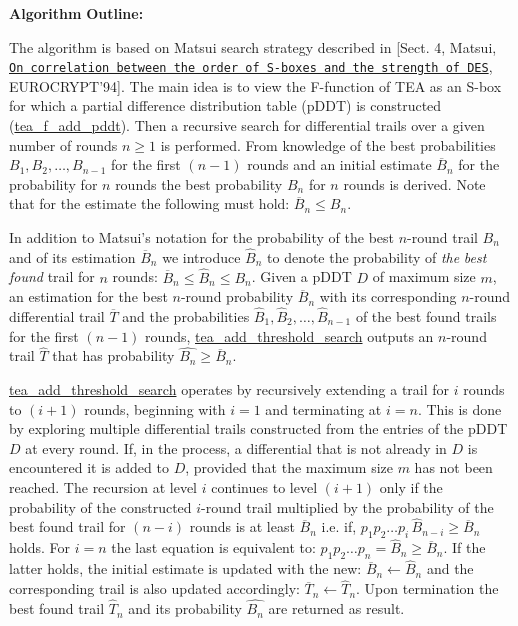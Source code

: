{\bfseries \-Algorithm} {\bfseries \-Outline\-:} 

\-The algorithm is based on \-Matsui search strategy described in \mbox{[}\-Sect. 4, \-Matsui, \href{http://dblp.uni-trier.de/rec/bibtex/conf/eurocrypt/Matsui94}{\tt \-On correlation between the order of \-S-\/boxes and the strength of \-D\-E\-S}, \-E\-U\-R\-O\-C\-R\-Y\-P\-T'94\mbox{]}. \-The main idea is to view the \-F-\/function of \-T\-E\-A as an \-S-\/box for which a partial difference distribution table (p\-D\-D\-T) is constructed (\hyperlink{tea-f-add-pddt_8hh_af962bfb5724a4f1dd45fdb2fdeac49f4}{tea\-\_\-f\-\_\-add\-\_\-pddt}). \-Then a recursive search for differential trails over a given number of rounds $n \ge 1$ is performed. \-From knowledge of the best probabilities $B_{1}, B_{2}, \ldots, B_{n-1}$ for the first $(n-1)$ rounds and an initial estimate ${\overline B_n}$ for the probability for $n$ rounds the best probability $B_{n}$ for $n$ rounds is derived. \-Note that for the estimate the following must hold\-: ${\overline B_n} \leq B_n$.

\-In addition to \-Matsui's notation for the probability of the best $n$-\/round trail $B_n$ and of its estimation ${\overline B_n}$ we introduce ${\widehat B_n}$ to denote the probability of {\itshape the\/} {\itshape best\/} {\itshape found\/} trail for $n$ rounds\-: ${\overline B_n} \leq {\widehat B_n} \leq B_n$. \-Given a p\-D\-D\-T $D$ of maximum size $m$, an estimation for the best $n$-\/round probability ${\overline B_n}$ with its corresponding $n$-\/round differential trail ${\overline T}$ and the probabilities ${{\widehat B_1}, {\widehat B_2}, \ldots, {\widehat B_{n-1}}}$ of the best found trails for the first $(n - 1)$ rounds, \hyperlink{tea-add-threshold-search_8cc_ab59db616cde68bf9245c7d24c98e3a6c}{tea\-\_\-add\-\_\-threshold\-\_\-search} outputs an $n$-\/round trail ${\widehat T}$ that has probability ${\widehat{B_n}} \ge {\overline B_n}$.

\hyperlink{tea-add-threshold-search_8cc_ab59db616cde68bf9245c7d24c98e3a6c}{tea\-\_\-add\-\_\-threshold\-\_\-search} operates by recursively extending a trail for $i$ rounds to $(i+1)$ rounds, beginning with $i = 1$ and terminating at $i = n$. \-This is done by exploring multiple differential trails constructed from the entries of the p\-D\-D\-T $D$ at every round. \-If, in the process, a differential that is not already in $D$ is encountered it is added to $D$, provided that the maximum size $m$ has not been reached. \-The recursion at level $i$ continues to level $(i+1)$ only if the probability of the constructed $i$-\/round trail multiplied by the probability of the best found trail for $(n - i)$ rounds is at least ${\overline B_n}$ i.\-e. if, $p_1 p_2 \ldots p_i\, {\widehat B_{n - i}} \ge {\overline B_n}$ holds. \-For $i = n$ the last equation is equivalent to\-: $p_1 p_2 \ldots p_n = {\widehat B_{n}} \ge {\overline B_n}$. \-If the latter holds, the initial estimate is updated with the new\-: ${\overline B_n} \gets {\widehat B_{n}}$ and the corresponding trail is also updated accordingly\-: ${\overline T_n} \gets {\widehat T_{n}}$. \-Upon termination the best found trail ${\widehat T_{n}}$ and its probability ${\widehat{B_n}}$ are returned as result.


